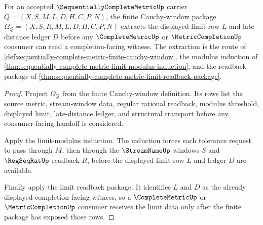 \begin{theorem}
\label{thm:sequentially-complete-metric-regular-limit-extraction}
For an accepted $\SequentiallyCompleteMetricUp$ carrier $Q=(X,S,M,L,D,H,C,P,N)$, the finite Cauchy-window package $\Omega_Q=(X,S,R,M,L,D,H,C,P,N)$ extracts the displayed limit row $L$ and late-distance ledger $D$ before any $\CompleteMetricUp$ or $\MetricCompletionUp$ consumer can read a completion-facing witness. The extraction is the route of \autoref{def:sequentially-complete-metric-finite-cauchy-window}, the modulus induction of \autoref{thm:sequentially-complete-metric-limit-modulus-induction}, and the readback package of \autoref{thm:sequentially-complete-metric-limit-readback-package}.
\end{theorem}
\begin{proof}
Project $\Omega_Q$ from the finite Cauchy-window definition. Its rows list the source metric, stream-window data, regular rational readback, modulus threshold, displayed limit, late-distance ledger, and structural transport before any consumer-facing handoff is considered.

Apply the limit-modulus induction. The induction forces each tolerance request to pass through $M$, then through the $\StreamNameUp$ windows $S$ and $\RegSeqRatUp$ readback $R$, before the displayed limit row $L$ and ledger $D$ are available.

Finally apply the limit readback package. It identifies $L$ and $D$ as the already displayed completion-facing witness, so a $\CompleteMetricUp$ or $\MetricCompletionUp$ consumer receives the limit data only after the finite package has exposed those rows.
\end{proof}





